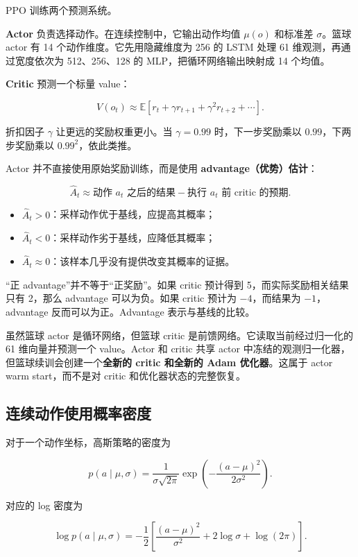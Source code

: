 \documentclass[
  chinese,
  11pt,
  letterpaper,
]{article}
\providecommand{\tightlist}{%
  \setlength{\itemsep}{0pt}\setlength{\parskip}{0pt}}
\begin{document}
PPO 训练两个预测系统。

\textbf{Actor} 负责选择动作。在连续控制中，它输出动作均值 \(\mu(o)\)
和标准差 \(\sigma\)。篮球 actor 有 14 个动作维度。它先用隐藏维度为 256
的 LSTM 处理 61 维观测，再通过宽度依次为 512、256、128 的
MLP，把循环网络输出映射成 14 个均值。

\textbf{Critic} 预测一个标量 value：

\[
V(o_t)\approx
\mathbb E[r_t+\gamma r_{t+1}+\gamma^2r_{t+2}+\cdots].
\]

折扣因子 \(\gamma\) 让更远的奖励权重更小。当 \(\gamma=0.99\)
时，下一步奖励乘以 \(0.99\)，下两步奖励乘以 \(0.99^2\)，依此类推。

Actor 并不直接使用原始奖励训练，而是使用
\textbf{advantage（优势）估计}：

\[
\widehat A_t \approx
\text{动作 }a_t\text{ 之后的结果}
-
\text{执行 }a_t\text{ 前 critic 的预期}.
\]

\begin{itemize}
\tightlist
\item
  \(\widehat A_t>0\)：采样动作优于基线，应提高其概率；
\item
  \(\widehat A_t<0\)：采样动作劣于基线，应降低其概率；
\item
  \(\widehat A_t\approx0\)：该样本几乎没有提供改变其概率的证据。
\end{itemize}

``正 advantage''并不等于``正奖励''。如果 critic 预计得到
5，而实际奖励相关结果只有 2，那么 advantage 可以为负。如果 critic 预计为
\(-4\)，而结果为 \(-1\)，advantage 反而可以为正。Advantage
表示与基线的比较。

虽然篮球 actor 是循环网络，但篮球 critic
是前馈网络。它读取当前经过归一化的 61 维向量并预测一个 value。Actor 和
critic 共享 actor
中冻结的观测归一化器，但篮球续训会创建一个\textbf{全新的 critic 和全新的
Adam 优化器}。这属于 actor warm start，而不是对 critic
和优化器状态的完整恢复。

\subsection{连续动作使用概率密度}\label{ux8fdeux7eedux52a8ux4f5cux4f7fux7528ux6982ux7387ux5bc6ux5ea6}

对于一个动作坐标，高斯策略的密度为

\[
p(a\mid\mu,\sigma)
=
\frac{1}{\sigma\sqrt{2\pi}}
\exp\left(
-\frac{(a-\mu)^2}{2\sigma^2}
\right).
\]

对应的 log 密度为

\[
\log p(a\mid\mu,\sigma)
=
-\frac12\left[
\frac{(a-\mu)^2}{\sigma^2}
+2\log\sigma
+\log(2\pi)
\right].
\]
\end{document}
